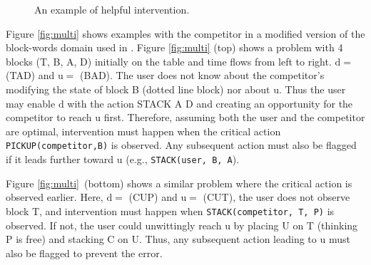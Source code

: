 \documentclass[letterpaper]{article}
\theoremstyle{plain}
\begin{document}
\begin{figure}[b]
         \vspace{0.1mm}
        \caption{An example of helpful intervention. }
        \label{fig:single}
\end{figure}

Figure \ref{fig:multi} shows examples with the competitor in a modified version of the block-words domain used in \cite{ramirez2009plan}.
Figure \ref{fig:multi} (top) shows a problem with 4 blocks (T, B, A, D) initially on the table and time flows from left to right. 
$\mathrm{d}=$ (TAD) and $\mathrm{u}=$ (BAD).
The user does not know about the competitor's modifying the state of block B (dotted line block) nor about $\mathrm{u}$.
Thus the user may enable $\mathrm{d}$ with the action STACK A D and creating an opportunity for the competitor to reach $\mathrm{u}$ first. 
Therefore, assuming both the user and the competitor are optimal, intervention must happen when the critical action \texttt{PICKUP(competitor,B)} is observed. 
Any subsequent action must also be flagged if it leads further toward $\mathrm{u}$  (e.g., \texttt{STACK(user, B, A}). 

Figure \ref{fig:multi}~(bottom) shows a similar problem where the critical action is observed earlier.
Here, $\mathrm{d}= $ (CUP) and $\mathrm{u}= $ (CUT), the user does not observe block T, 
and intervention must happen when \texttt{STACK(competitor, T, P)} is observed. If not, the user could unwittingly reach $\mathrm{u}$ by placing U on T (thinking P is free) and stacking C on U. 
Thus, any subsequent action leading  to $\mathrm{u}$ must also be flagged to prevent the error.
\end{document}
